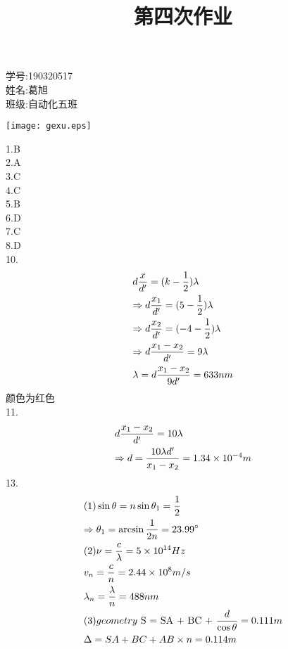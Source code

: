 \documentclass{article}
\begin{document}
\title{第四次作业}
\maketitle
\begin{minipage}[b]{0.5\linewidth}
学号:190320517\\
姓名:葛旭\\
班级:自动化五班\\
\end{minipage}
\hfill
\begin{minipage}[b]{0.5\linewidth}
\texttt{[image: gexu.eps]}\\
\end{minipage}
1.B\\
2.A\\
3.C\\
4.C\\
5.B\\
6.D\\
7.C\\
8.D\\
10.\[\begin{gathered}
d\frac{x}{{d'}} = (k - \frac{1}{2})\lambda  \hfill \\
\Rightarrow d\frac{{{x_1}}}{{d'}} = (5 - \frac{1}{2})\lambda  \hfill \\
\Rightarrow d\frac{{{x_2}}}{{d'}} = ( - 4 - \frac{1}{2})\lambda  \hfill \\
\Rightarrow d\frac{{{x_1} - {x_2}}}{{d'}} = 9\lambda  \hfill \\
\lambda  = d\frac{{{x_1} - {x_2}}}{{9d'}} = 633nm \hfill \\ 
\end{gathered} \]
颜色为红色\\
11.\[\begin{gathered}
d\frac{{{x_1} - {x_2}}}{{d'}} = 10\lambda  \hfill \\
\Rightarrow d = \frac{{10\lambda d'}}{{{x_1} - {x_2}}} = 1.34 \times {10^{ - 4}}m \hfill \\ 
\end{gathered} \]
13.\[\begin{gathered}
(1)\sin \theta  = n\sin {\theta _1} = \frac{1}{2} \hfill \\
\Rightarrow {\theta _1} = \arcsin \frac{1}{{2n}} = {23.99^ \circ } \hfill \\
(2)\nu  = \frac{c}{\lambda } = 5 \times {10^{14}}Hz \hfill \\
{v_n} = \frac{c}{n} = 2.44 \times {10^8}m/s \hfill \\
{\lambda _n} = \frac{\lambda }{n} = 488nm \hfill \\
(3)geometry{\text{  S = SA + BC + }}\frac{d}{{\cos \theta }} = 0.111m \hfill \\
\Delta  = SA + BC + AB \times n = 0.114m \hfill \\ 
\end{gathered} \]
\end{document}
